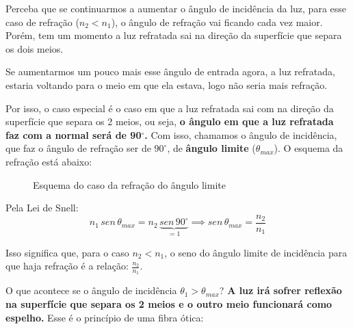 \documentclass[12pt]{extarticle}
\newcommand{\<}{\langle}
\renewcommand{\>}{\rangle}
\theoremstyle{definition}
\begin{document}
Perceba que se continuarmos a aumentar o ângulo de incidência da luz, para esse caso de refração ($n_2<n_1$), o ângulo de refração vai ficando cada vez maior. Porém, tem um momento a luz refratada sai na direção da superfície que separa os dois meios. 

Se aumentarmos um pouco mais esse ângulo de entrada agora, a luz refratada, estaria voltando para o meio em que ela estava, logo não seria mais refração.

Por isso, o caso especial é o caso em que a luz refratada sai com na direção da superfície que separa os 2 meios, ou seja, \textbf{o ângulo em que a luz refratada faz com a normal será de 90$^\circ$.} Com isso, chamamos o ângulo de incidência, que faz o ângulo de refração ser de $90^\circ$, de \textbf{ângulo limite} ($\theta_{max}$). O esquema da refração está abaixo:
\begin{figure}[H]
    \centering
    \caption{Esquema do caso da refração do ângulo limite}
    \label{fig:refracao_limite}
\end{figure}

Pela Lei de Snell:
\begin{equation}
    n_1\,sen\,\theta_{max} = n_2\,\underbrace{ sen\,90^\circ}_{=1} \implies \boxed{sen\,\theta_{max} = \frac{n_2}{n_1}}
\end{equation}

Isso significa que, para o caso $n_2 <n_1$, o seno do ângulo limite de incidência para que haja refração é a relação: $\frac{n_2}{n_1}$.

O que acontece se o ângulo de incidência $\theta_1 > \theta_{max}$? \textbf{A luz irá sofrer reflexão na superfície que separa os 2 meios e o outro meio funcionará como espelho.} Esse é o princípio de uma fibra ótica:
\end{document}

